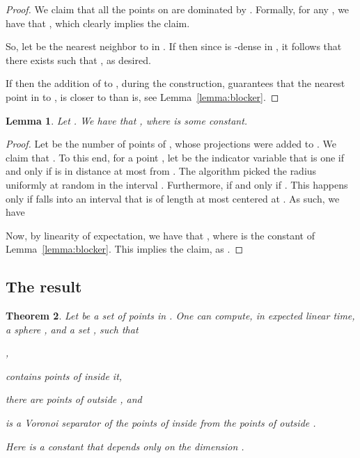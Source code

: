 \InSubmitVer{\documentclass[11pt]{article}}
\numberwithin{figure}{section}
\numberwithin{table}{section}
\numberwithin{equation}{section}
\newtheorem{theorem}{Theorem}[section] \newtheorem{lemma}[theorem]{Lemma}
\newcommand{\lemlab}[1]{\label{lemma:#1}}
\newcommand{\lemref}[1]{Lemma~\ref{lemma:#1}}
\newcommand{\thmlab}[1]{\label{theorem:#1}}
\begin{document}
\begin{proof}
    We claim that all the points on  are dominated by
    . Formally, for any , we have that
    , which
    clearly implies the claim.
    
    So, let  be the nearest neighbor to  in .
    If  then since  is
    -dense in , it follows that there exists  such that , as desired.
    
    If  then the addition of
     to , during the
    construction, guarantees that the nearest point in  to
    , is closer to  than  is, see
    \lemref{blocker}.
\end{proof}

\begin{lemma}
    \lemlab{small:separator}Let . We have that , where  is some constant.
\end{lemma}
\begin{proof}
    Let  be the number of points of , whose projections
    were added to . We claim that .  To this end, for a point ,
    let  be the indicator variable that is one if and only if
     is in distance at most  from . The
    algorithm picked the radius  uniformly at random in the
    interval . Furthermore,  if and only
    if . This happens only if  falls into an interval
     that is of length at most  centered at
    .  As such, we have
    
    Now, by linearity of expectation, we have that , where
     is the constant of \lemref{blocker}. This implies the claim,
    as .
\end{proof}



\subsection{The result}



\begin{theorem}
    \thmlab{separator:main}Let  be a set of  points in . One can compute,
    in expected linear time, a sphere , and a set , such that
    \begin{compactenum}[\quad (i)]
        \item ,
        \item  contains  points of 
        inside it,
        \item there are  points of  outside
        , and
        \item  is a Voronoi separator of the points of
         inside  from the points of 
        outside .
    \end{compactenum}
    Here  is a constant that depends only on the dimension .
\end{theorem}
\end{document}
